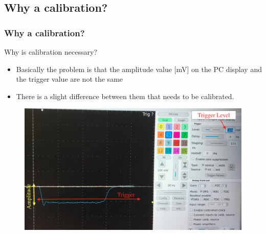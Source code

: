 \subsection{Why a calibration?}
\begin{frame} [fragile]
\small
	\frametitle{Why a calibration?}
			
	\begin{alertblock}{Why is calibration necessary?}
		\begin{itemize}
			\item Basically the problem is that the amplitude value [mV] on the PC display and the trigger value are not the same
			\item There is a slight difference between them that needs to be calibrated.
		\end{itemize}
	\end{alertblock}
	    	
		\begin{figure}
		\centering
			\includegraphics[scale=0.15]{photos/why_im.png}
		\end{figure}

	
	
\end{frame}
